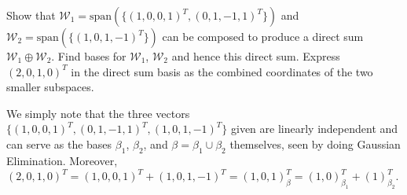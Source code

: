 \begin{Exercise}
Show that $\mathcal{W}_1 = \text{span}(\{(1,0,0,1)^T, (0,1,-1,1)^T\})$ and $\mathcal{W}_2 = \text{span}(\{(1,0,1,-1)^T\})$ can be composed to produce a direct sum $\mathcal{W}_1 \oplus \mathcal{W}_2$. Find bases for $\mathcal{W}_1$, $\mathcal{W}_2$ and hence this direct sum. Express $(2,0,1,0)^T$ in the direct sum basis as the combined coordinates of the two smaller subspaces.
\end{Exercise}
\begin{Answer}
We simply note that the three vectors $\{(1,0,0,1)^T, (0,1,-1,1)^T, \allowbreak (1,0,1,-1)^T\}$ given are linearly independent and can serve as the bases $\beta_1$, $\beta_2$, and $\beta = \beta_1 \cup \beta_2$ themselves, seen by doing Gaussian Elimination. Moreover, $(2,0,1,0)^T = (1,0,0,1)^T + (1,0,1,-1)^T = (1,0,1)^T_\beta = (1,0)^T_{\beta_1} + (1)^T_{\beta_2}$.
\end{Answer}

